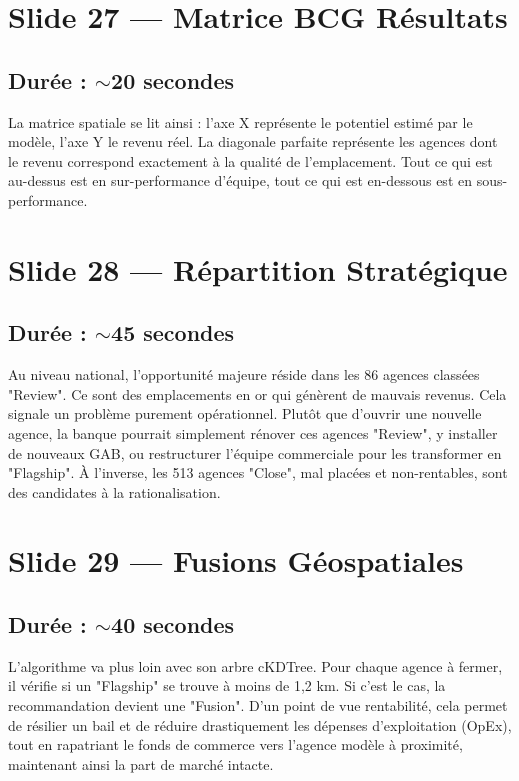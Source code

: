 \documentclass[11pt,a4paper]{article}
\begin{document}
\section{Slide 27 --- Matrice BCG Résultats}
\subsection{Durée : $\sim$20 secondes}
La matrice spatiale se lit ainsi : l'axe X représente le potentiel estimé par le modèle, l'axe Y le revenu réel. La diagonale parfaite représente les agences dont le revenu correspond exactement à la qualité de l'emplacement. Tout ce qui est au-dessus est en sur-performance d'équipe, tout ce qui est en-dessous est en sous-performance.

\section{Slide 28 --- Répartition Stratégique}
\subsection{Durée : $\sim$45 secondes}
Au niveau national, l'opportunité majeure réside dans les 86 agences classées "Review". Ce sont des emplacements en or qui génèrent de mauvais revenus. Cela signale un problème purement opérationnel. Plutôt que d'ouvrir une nouvelle agence, la banque pourrait simplement rénover ces agences "Review", y installer de nouveaux GAB, ou restructurer l'équipe commerciale pour les transformer en "Flagship". À l'inverse, les 513 agences "Close", mal placées et non-rentables, sont des candidates à la rationalisation.

\section{Slide 29 --- Fusions Géospatiales}
\subsection{Durée : $\sim$40 secondes}
L'algorithme va plus loin avec son arbre cKDTree. Pour chaque agence à fermer, il vérifie si un "Flagship" se trouve à moins de 1,2 km. Si c'est le cas, la recommandation devient une "Fusion". D'un point de vue rentabilité, cela permet de résilier un bail et de réduire drastiquement les dépenses d'exploitation (OpEx), tout en rapatriant le fonds de commerce vers l'agence modèle à proximité, maintenant ainsi la part de marché intacte.
\end{document}

